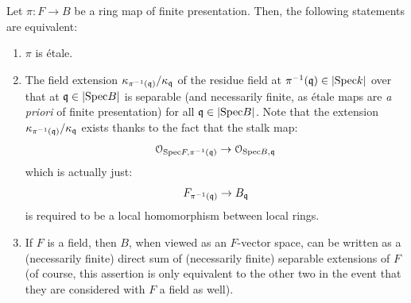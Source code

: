         \begin{proposition} \label{prop: separable_criterion_for_etaleness} 
            Let $\pi: F \to B$ be a ring map of finite presentation. Then, the following statements are equivalent:
                \begin{enumerate}
                    \item $\pi$ is \'etale.
                    \item The field extension $\kappa_{\pi^{-1}(\mathfrak{q})}/\kappa_{\mathfrak{q}}$ of the residue field at $\pi^{-1}(\mathfrak{q}) \in |\mathrm{Spec} k|$ over that at $\mathfrak{q} \in |\mathrm{Spec} B|$ is separable (and necessarily finite, as \'etale maps are \textit{a priori} of finite presentation) for all $\mathfrak{q} \in |\mathrm{Spec} B|$. Note that the extension $\kappa_{\pi^{-1}(\mathfrak{q})}/\kappa_{\mathfrak{q}}$ exists thanks to the fact that the stalk map:
                        $$\mathcal{O}_{\mathrm{Spec} F, \pi^{-1}(\mathfrak{q})} \to \mathcal{O}_{\mathrm{Spec} B, \mathfrak{q}}$$
                    which is actually just: 
                        $$F_{\pi^{-1}(\mathfrak{q})} \to B_{\mathfrak{q}}$$
                    is required to be a local homomorphism between local rings.
                    \item If $F$ is a field, then $B$, when viewed as an $F$-vector space, can be written as a (necessarily finite) direct sum of (necessarily finite) separable extensions of $F$ (of course, this assertion is only equivalent to the other two in the event that they are considered with $F$ a field as well).
                \end{enumerate}
        \end{proposition}
